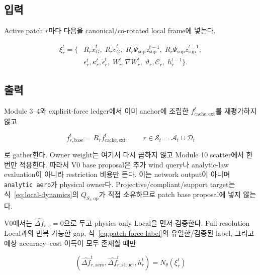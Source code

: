 \documentclass[11pt,a4paper]{article}
\begin{document}
\subsection*{입력}

Active patch \(r\)마다 다음을 canonical/co-rotated local frame에 넣는다.

\begin{equation}
\begin{aligned}
  \xi_r^t=\{&
  R_r\widetilde x_G^t,\;
  R_r\widetilde v_G^t,\;
  R_r\Psi_{\mathrm{sup}} z_{\mathrm{sup}}^{t-1},\;
  R_r\Psi_{\mathrm{sup}}\dot z_{\mathrm{sup}}^{t-1},\\
  &\epsilon_r^t,\kappa_r^t,\dot\epsilon_r^t,\;
  W_r^t,\nabla W_r^t,\;
  \vartheta_r,\mathcal C_r,\;
  h_r^{t-1}\}.
\end{aligned}
\end{equation}

\subsection*{출력}

Module 3--4와 explicit-force ledger에서 이미 anchor에 조립한
\(f_{\mathrm{cache,ext}}^t\)를 재평가하지 않고

\begin{equation}
  f_{r,\mathrm{base}}^t
  =R_r f_{\mathrm{cache,ext}}^t,
  \qquad r\in\mathcal S_t=\mathcal A_t\cup\mathcal D_t
\end{equation}

로 gather한다. Owner weight는 여기서 다시 곱하지 않고 Module 10 scatter에서 한 번만 적용한다.
따라서 V0 base proposal은 추가 wind query나 analytic-law evaluation이 아니라 restriction 비용만 든다.
이는 network output이 아니며 \texttt{analytic aero}가 physical owner다.
Projective/compliant/support target는 식~\eqref{eq:local-dynamics}의
\(Q_{\mathcal S_t,\mathrm{op}}\)가 직접 소유하므로 patch base proposal에 넣지 않는다.

V0에서는 \(\widehat{\Delta f}_{r,c}=0\)으로 두고 physics-only Local을 먼저 검증한다.
Full-resolution Local과의 반복 가능한 gap, 식~\eqref{eq:patch-force-label}의 유일한/검증된 label,
그리고 예상 accuracy--cost 이득이 모두 존재할 때만

\begin{equation}
  (\widehat{\Delta f}_{r,\mathrm{aero}}^t,
   \widehat{\Delta f}_{r,\mathrm{struct}}^t,
   h_r^t)
  =
  N_\theta(\xi_r^t)
  \label{eq:missing-force-net}
\end{equation}
\end{document}
